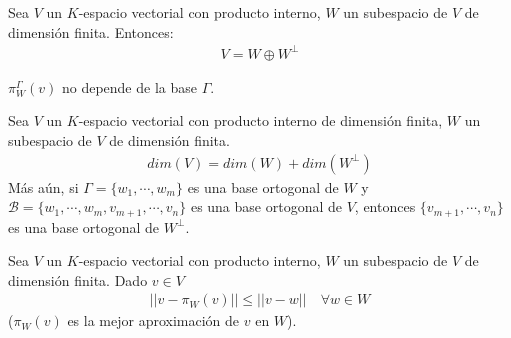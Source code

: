 \begin{theorem}{}{}
    Sea $V$ un $K$-espacio vectorial con producto interno, $W$ un subespacio de $V$ de dimensión finita. Entonces:
    \begin{align*}
        V = W \oplus W^\perp
    \end{align*}
\end{theorem}
\begin{obs}{}{}
    $\pi_{W}^\Gamma(v)$ no depende de la base $\Gamma$.
\end{obs}
\begin{corollary}{}{}
    Sea $V$ un $K$-espacio vectorial con producto interno de dimensión finita, $W$ un subespacio de $V$ de dimensión finita.
    \begin{align*}
        dim(V) = dim(W) + dim(W^\perp)
    \end{align*}
    Más aún, si $\Gamma = \{w_1, \cdots, w_m\}$ es una base ortogonal de $W$ y $\mathcal{B} = \{w_1, \cdots, w_m, v_{m+1}, \cdots, v_n\}$ es una base ortogonal de $V$, entonces $\{v_{m+1}, \cdots, v_n\}$ es una base ortogonal de $W^\perp$.
\end{corollary}
\begin{theorem}{}{}
    Sea $V$ un $K$-espacio vectorial con producto interno, $W$ un subespacio de $V$ de dimensión finita. Dado $v \in V$
    \begin{align*}
        ||v - \pi_{W}(v)|| \leq ||v - w|| \quad \forall w \in W
    \end{align*}
    ($\pi_{W}(v)$ es la mejor aproximación de $v$ en $W$).
\end{theorem}